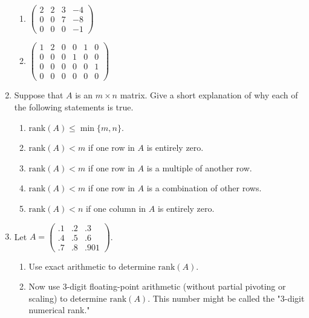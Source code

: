 \documentclass[10pt, a4paper]{article}
\begin{document}
\begin{enumerate}[leftmargin=*, label=\bfseries 2.1.\arabic*]
\begin{enumerate}[label=(\alph*)]
    \item $\begin{pmatrix}
        2 & 2 & 3 & -4 \\
        0 & 0 & 7 & -8 \\
        0 & 0 & 0 & -1
    \end{pmatrix}$
    
    \item $\begin{pmatrix}
        1 & 2 & 0 & 0 & 1 & 0 \\
        0 & 0 & 0 & 1 & 0 & 0 \\
        0 & 0 & 0 & 0 & 0 & 1 \\
        0 & 0 & 0 & 0 & 0 & 0
    \end{pmatrix}$
\end{enumerate}

\item Suppose that \( A \) is an \( m \times n \) matrix. Give a short explanation of why each of the following statements is true.

\begin{enumerate}[label=(\alph*)]
    \item \(\text{rank}(A) \leq \min\{m, n\}\).
    
    \item \(\text{rank}(A) < m\) if one row in \( A \) is entirely zero.
    
    \item \(\text{rank}(A) < m\) if one row in \( A \) is a multiple of another row.
    
    \item \(\text{rank}(A) < m\) if one row in \( A \) is a combination of other rows.
    
    \item \(\text{rank}(A) < n\) if one column in \( A \) is entirely zero.
\end{enumerate}

\item Let \( A = \begin{pmatrix}
    .1 & .2 & .3 \\
    .4 & .5 & .6 \\
    .7 & .8 & .901
\end{pmatrix} \).

\begin{enumerate}[label=(\alph*)]
    \item Use exact arithmetic to determine \(\text{rank}(A)\).
    
    \item Now use 3-digit floating-point arithmetic (without partial pivoting or scaling) to determine \(\text{rank}(A)\). This number might be called the "3-digit numerical rank."
    

\end{enumerate}
\end{enumerate}
\end{document}
